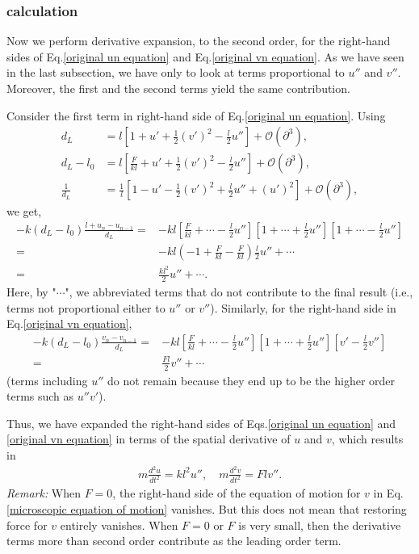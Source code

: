 \documentclass{article}
\begin{document}
\subsubsection{calculation}
Now we perform derivative expansion, to the second order, for the right-hand sides of Eq.\eqref{original un equation} and Eq.\eqref{original vn equation}.  As we have seen in the last subsection, we have only to look at terms proportional to $u''$ and $v''$.  Moreover, the first and the second terms yield the same contribution.   

Consider the first term in right-hand side of Eq.\eqref{original un equation}.  Using
\begin{align}
d_L &= l\left[ 1+u'+\frac{1}{2}(v')^2-\frac{l}{2}u'' \right] +\mathcal O(\partial^3), \nonumber \\
d_L - l_0 &= l\left[ \frac{F}{kl}+u'+\frac{1}{2}(v')^2-\frac{l}{2}u'' \right] +\mathcal O(\partial^3), \nonumber \\
\frac{1}{d_L} &= \frac{1}{l}\left[1-u'-\frac{1}{2}(v')^2+\frac{l}{2}u''+(u')^2  \right] +\mathcal O(\partial^3),
\end{align}
we get,
\begin{align}
-k(d_L-l_0)\frac{l+u_n-u_{n-1}}{d_L} =& -kl\left[ \frac{F}{kl}+\cdots-\frac{l}{2}u'' \right]
\left[1+\cdots+\frac{l}{2}u'' \right]
\left[1+\cdots-\frac{l}{2}u''\right]
 \nonumber \\
=& -kl \left(-1+\frac{F}{kl}-\frac{F}{kl}\right)\frac{l}{2}u'' + \cdots \nonumber \\
=& \frac{kl^2}{2}u'' + \cdots.
\end{align}
Here, by "$\cdots$", we abbreviated terms that do not contribute to the final result (i.e., terms not proportional either to $u''$ or $v''$).
Similarly, for the right-hand side in Eq.\eqref{original vn equation},
\begin{align}
-k(d_L-l_0)\frac{v_n-v_{n-1}}{d_L} =& -kl\left[ \frac{F}{kl}+\cdots-\frac{l}{2}u'' \right]
\left[1+\cdots+\frac{l}{2}u'' \right]
\left[v'-\frac{l}{2}v''\right]\nonumber \\
=& \frac{Fl}{2}v'' + \cdots
\end{align}
(terms including $u''$ do not remain because they end up to be the higher order terms such as $u''v'$).

Thus, we have expanded the right-hand sides of Eqs.\eqref{original un equation} and \eqref{original vn equation} in terms of the spatial derivative of $u$ and $v$, which results in 
\begin{align}
    m\frac{d^2u}{dt^2} = kl^2 u'', \quad m\frac{d^2v}{dt^2} = Fl v''. \label{microscopic equation of motion}
\end{align}
{\it Remark:} When $F=0$, the right-hand side of the equation of motion for $v$ in Eq.\eqref{microscopic equation of motion} vanishes.  But this does not mean that restoring force for $v$ entirely vanishes.  When $F=0$ or $F$ is very small, then the derivative terms more than second order contribute as the leading order term.   
\end{document}
